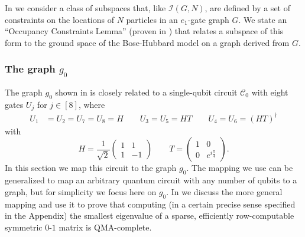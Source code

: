 \documentclass[../thesis-main/thesis-main]{subfiles}
\begin{document}
In  we consider a class of subspaces that, like $\mathcal{I}(G,N)$, are defined by a set of constraints on the locations of $N$ particles in an $e_{1}$-gate graph $G$. We state an ``Occupancy Constraints Lemma'' (proven in ) that relates a subspace of this form to the ground space of the Bose-Hubbard model on a graph derived from $G$.


\subsubsection{The graph $g_0$}

The graph $g_{0}$ shown in  is closely related to a single-qubit circuit $\mathcal{C}_{0}$ with eight gates $U_{j}$ for $j\in[8]$, where 
\begin{align*}
U_{1} & =U_{2}=U_{7}=U_{8}=H\qquad U_{3}=U_{5}=HT\qquad U_{4}=U_{6}=\left(HT\right)^{\dagger}
\end{align*}
with 
\[
H=\frac{1}{\sqrt{2}}\begin{pmatrix}
1 & 1\\
1 & -1
\end{pmatrix}\qquad T=\begin{pmatrix}
1 & 0\\
0 & e^{i\frac{\pi}{4}}
\end{pmatrix}.
\]
In this section we map this circuit to the graph $g_{0}$. The mapping we use can be generalized to map an arbitrary quantum circuit with any number of qubits to a graph, but for simplicity we focus here on $g_{0}$. In  we discuss the more general mapping and use it to prove that computing (in a certain precise sense specified in the Appendix) the smallest eigenvalue of a sparse, efficiently row-computable symmetric $0$-$1$ matrix is QMA-complete.
\end{document}
